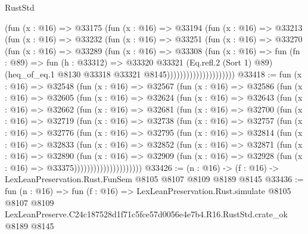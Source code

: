 \begin{lexlean}{RustStd}
\begin{coremodule}
                          (fun (x : @16) =>
                          @33175
                            (fun (x : @16) =>
                            @33194
                              (fun (x : @16) =>
                              @33213
                                (fun (x : @16) =>
                                @33232
                                  (fun (x : @16) =>
                                  @33251
                                    (fun (x : @16) =>
                                    @33270
                                      (fun (x : @16) =>
                                      @33289
                                        (fun (x : @16) =>
                                        @33308
                                          (fun (x : @16) =>
                                          fun (fn : @89) =>
                                          fun (h : @33312) =>
                                          @33320
                                            @33321
                                            (Eq.refl.{2} (Sort 1) @89)
                                            (heq_of_eq.{1}
                                              @8130
                                              @33318
                                              @33321
                                              @8145)))))))))))))))))))))
@33418 := fun (x : @16) =>
  @32548
    (fun (x : @16) =>
    @32567
      (fun (x : @16) =>
      @32586
        (fun (x : @16) =>
        @32605
          (fun (x : @16) =>
          @32624
            (fun (x : @16) =>
            @32643
              (fun (x : @16) =>
              @32662
                (fun (x : @16) =>
                @32681
                  (fun (x : @16) =>
                  @32700
                    (fun (x : @16) =>
                    @32719
                      (fun (x : @16) =>
                      @32738
                        (fun (x : @16) =>
                        @32757
                          (fun (x : @16) =>
                          @32776
                            (fun (x : @16) =>
                            @32795
                              (fun (x : @16) =>
                              @32814
                                (fun (x : @16) =>
                                @32833
                                  (fun (x : @16) =>
                                  @32852
                                    (fun (x : @16) =>
                                    @32871
                                      (fun (x : @16) =>
                                      @32890
                                        (fun (x : @16) =>
                                        @32909
                                          (fun (x : @16) =>
                                          @32928 (fun (x : @16) => @33375)))))))))))))))))))))
@33426 := (n : @16) -> (f : @16) -> LexLeanPreservation.Rust.FunSem @8105 @8107 @8109 @8189 @8145
@33436 := fun (n : @16) =>
  fun (f : @16) =>
  LexLeanPreservation.Rust.simulate
    @8105
    @8107
    @8109
    LexLeanPreserve.C24c187528d1f71c5fce57d0056e4e7b4.R16.RustStd.crate_ok
    @8189
    @8145
\end{coremodule}
\end{lexlean}
